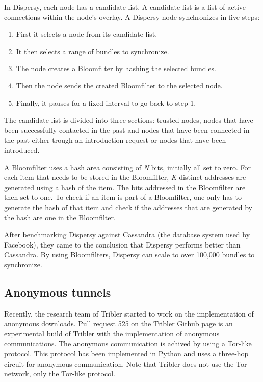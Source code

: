 		In Dispersy, each node has a candidate list. A candidate list is a list of active connections within the node's overlay. A Dispersy node synchronizes in five steps:
		
		\begin{enumerate}
			\item First it selects a node from its candidate list.
			\item It then selects a range of bundles to synchronize.
			\item The node creates a Bloomfilter by hashing the selected bundles.
			\item Then the node sends the created Bloomfilter to the selected node.
			\item Finally, it pauses for a fixed interval to go back to step 1.
		\end{enumerate}
		
		The candidate list is divided into three sections: trusted nodes, nodes that have been successfully contacted in the past and nodes that have been connected in the past either trough an introduction-request or nodes that have been introduced.
		
		A Bloomfilter uses a hash area consisting of \emph{N} bits, initially all set to zero. For each item that needs to be stored in the Bloomfilter, \emph{K} distinct addresses are generated using a hash of the item. The bits addressed in the Bloomfilter are then set to one. To check if an item is part of a Bloomfilter, one only has to generate the hash of that item and check if the addresses that are generated by the hash are one in the Bloomfilter.
		
		After benchmarking Dispersy against Cassandra (the database system used by Facebook), they came to the conclusion that Dispersy performs better than Cassandra. By using Bloomfilters, Dispersy can scale to over 100,000 bundles to synchronize.
		
	\subsection{Anonymous tunnels}
	\label{sec:anonymoustunnels}
		Recently, the research team of Tribler started to work on the implementation of anonymous downloads. Pull request 525 on the Tribler Github page \cite{pullrequest525} is an experimental build of Tribler with the implementation of anonymous communications. The anonymous communication is achived by using a Tor-like protocol. This protocol has been implemented in Python and uses a three-hop circuit for anonymous communication. Note that Tribler does not use the Tor network, only the Tor-like protocol.
		

